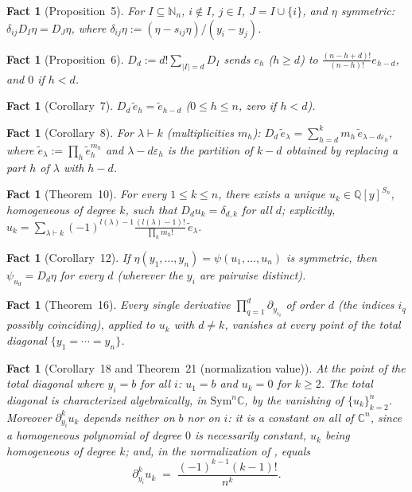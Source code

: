 \documentclass[11pt]{article}
\newtheorem{fact}[theorem]{Fact}
\theoremstyle{remark}
\newcommand{\NN}{\mathbb{N}}
\newcommand{\CC}{\mathbb{C}}
\newcommand{\QQ}{\mathbb{Q}}
\begin{document}
\begin{fact}[Proposition~5]\label{fact:E}
For $I\subseteq\NN_n$, $i\notin I$, $j\in I$, $J=I\cup\{i\}$, and $\eta$ symmetric: $\delta_{ij}D_I\eta = D_J\eta$, where $\delta_{ij}\eta:=(\eta-s_{ij}\eta)/(y_i-y_j)$.
\end{fact}

\begin{fact}[Proposition~6]\label{fact:F}
$D_d:=d!\sum_{|I|=d}D_I$ sends $e_h$ ($h\ge d$) to $\frac{(n-h+d)!}{(n-h)!}e_{h-d}$, and $0$ if $h<d$.
\end{fact}

\begin{fact}[Corollary~7]\label{fact:G}
$D_d\,\tilde e_h = \tilde e_{h-d}$ ($0\le h\le n$, zero if $h<d$).
\end{fact}

\begin{fact}[Corollary~8]\label{fact:H}
For $\lambda\vdash k$ (multiplicities $m_h$): $D_d\,\tilde e_\lambda = \sum_{h=d}^k m_h\,\tilde e_{\lambda-d\varepsilon_h}$, where $\tilde e_\lambda:=\prod_h \tilde e_h^{m_h}$ and $\lambda-d\varepsilon_h$ is the partition of $k-d$ obtained by replacing a part $h$ of $\lambda$ with $h-d$.
\end{fact}

\begin{fact}[Theorem~10]\label{fact:I}
For every $1\le k\le n$, there exists a unique $u_k\in\QQ[y]^{S_n}$, homogeneous of degree $k$, such that $D_d u_k=\delta_{d,k}$ for all $d$; explicitly,
$u_k = \sum_{\lambda\vdash k}(-1)^{l(\lambda)-1}\frac{(l(\lambda)-1)!}{\prod_h m_h!}\,\tilde e_\lambda$.
\end{fact}

\begin{fact}[Corollary~12]\label{fact:J}
If $\eta(y_1,\dots,y_n)=\psi(u_1,\dots,u_n)$ is symmetric, then $\psi_{u_d}=D_d\eta$ for every $d$ (wherever the $y_i$ are pairwise distinct).
\end{fact}

\begin{fact}[Theorem~16]\label{fact:K}
Every single derivative $\prod_{q=1}^d\partial_{y_{i_q}}$ of order $d$ (the indices $i_q$ possibly coinciding), applied to $u_k$ with $d\ne k$, vanishes at every point of the total diagonal $\{y_1=\cdots=y_n\}$.
\end{fact}

\begin{fact}[Corollary~18 and Theorem~21 (normalization value)]\label{fact:L}
At the point of the total diagonal where $y_i=b$ for all $i$: $u_1=b$ and $u_k=0$ for $k\ge2$. The total diagonal is characterized algebraically, in $\mathrm{Sym}^n\CC$, by the vanishing of $\{u_k\}_{k=2}^n$. Moreover $\partial_{y_i}^k u_k$ depends neither on $b$ nor on $i$: it is a constant \emph{on all of $\CC^n$}, since a homogeneous polynomial of degree $0$ is necessarily constant, $u_k$ being homogeneous of degree $k$; and, in the normalization of \cite{Ze}, equals
\[
\partial_{y_i}^k u_k \;=\; \frac{(-1)^{k-1}(k-1)!}{n^k}.
\]
\end{fact}
\end{document}
